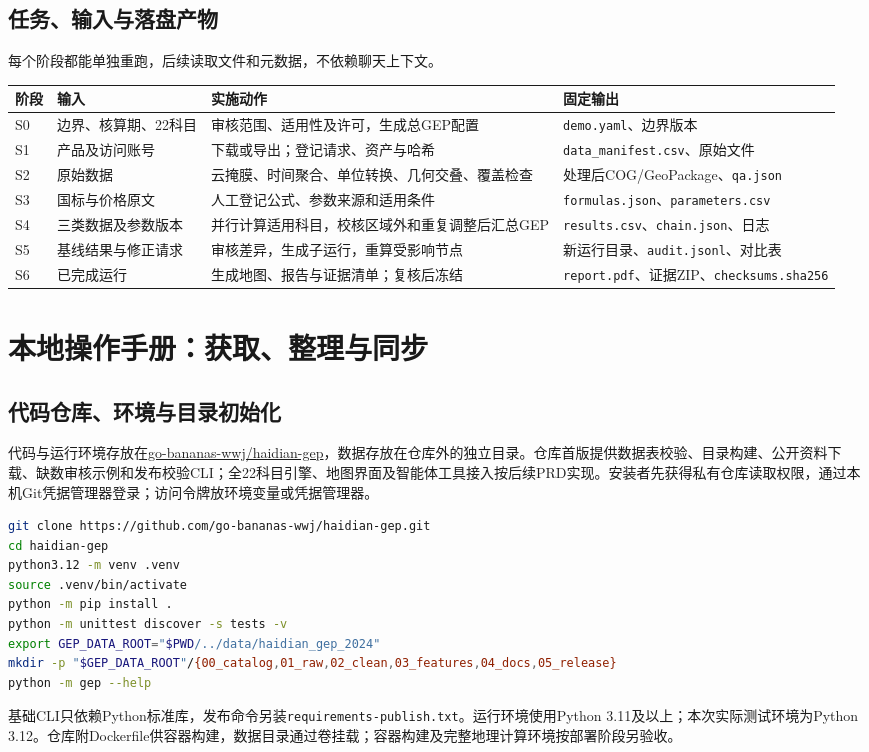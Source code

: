 \documentclass[12pt,a4paper,fontset=fandol]{ctexart}
\newcommand{\file}[1]{\nolinkurl{#1}}
\begin{document}
\subsection{任务、输入与落盘产物}
每个阶段都能单独重跑，后续读取文件和元数据，不依赖聊天上下文。
{\small
\begin{longtable}{P{1.1cm}P{3cm}P{5cm}P{3.9cm}}
\toprule 阶段 & 输入 & 实施动作 & 固定输出 \\\midrule\endhead
S0 & 边界、核算期、22科目 & 审核范围、适用性及许可，生成总GEP配置 & \file{demo.yaml}、边界版本 \\
S1 & 产品及访问账号 & 下载或导出；登记请求、资产与哈希 & \file{data_manifest.csv}、原始文件 \\
S2 & 原始数据 & 云掩膜、时间聚合、单位转换、几何交叠、覆盖检查 & 处理后COG/GeoPackage、\file{qa.json} \\
S3 & 国标与价格原文 & 人工登记公式、参数来源和适用条件 & \file{formulas.json}、\file{parameters.csv} \\
S4 & 三类数据及参数版本 & 并行计算适用科目，校核区域外和重复调整后汇总GEP & \file{results.csv}、\file{chain.json}、日志 \\
S5 & 基线结果与修正请求 & 审核差异，生成子运行，重算受影响节点 & 新运行目录、\file{audit.jsonl}、对比表 \\
S6 & 已完成运行 & 生成地图、报告与证据清单；复核后冻结 & \file{report.pdf}、证据ZIP、\file{checksums.sha256} \\
\bottomrule
\end{longtable}}

\section{本地操作手册：获取、整理与同步}\label{sec:operations}
\subsection{代码仓库、环境与目录初始化}
代码与运行环境存放在\href{https://github.com/go-bananas-wwj/haidian-gep}{go-bananas-wwj/haidian-gep}，数据存放在仓库外的独立目录。仓库首版提供数据表校验、目录构建、公开资料下载、缺数审核示例和发布校验CLI；全22科目引擎、地图界面及智能体工具接入按后续PRD实现。安装者先获得私有仓库读取权限，通过本机Git凭据管理器登录；访问令牌放环境变量或凭据管理器。

\begin{lstlisting}[language=bash]
git clone https://github.com/go-bananas-wwj/haidian-gep.git
cd haidian-gep
python3.12 -m venv .venv
source .venv/bin/activate
python -m pip install .
python -m unittest discover -s tests -v
export GEP_DATA_ROOT="$PWD/../data/haidian_gep_2024"
mkdir -p "$GEP_DATA_ROOT"/{00_catalog,01_raw,02_clean,03_features,04_docs,05_release}
python -m gep --help
\end{lstlisting}
基础CLI只依赖Python标准库，发布命令另装\file{requirements-publish.txt}。运行环境使用Python 3.11及以上；本次实际测试环境为Python 3.12。仓库附Dockerfile供容器构建，数据目录通过卷挂载；容器构建及完整地理计算环境按部署阶段另验收。
\end{document}
